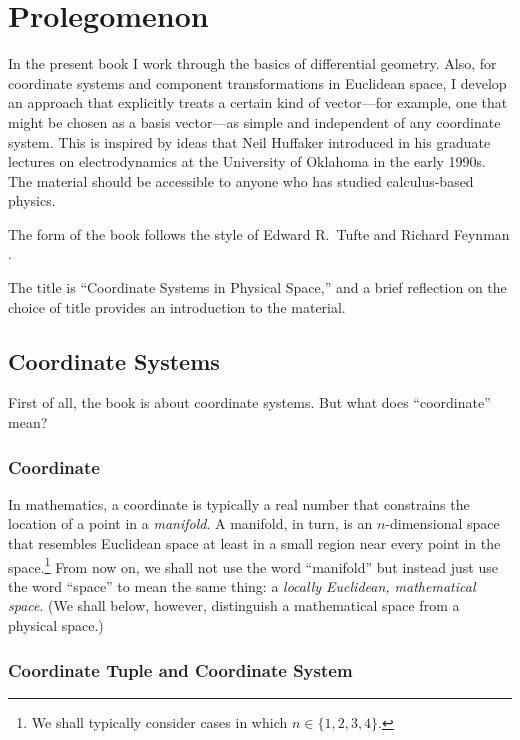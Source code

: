 \cleardoublepage
\chapter*{Prolegomenon}

In the present book I work through the basics of differential geometry.  Also,
for coordinate systems and component transformations in Euclidean space, I
develop an approach that explicitly treats a certain kind of vector---for
example, one that might be chosen as a basis vector---as simple and independent
of any coordinate system.  This is inspired by ideas that Neil Huffaker
introduced in his graduate lectures on electrodynamics at the University of
Oklahoma in the early 1990s.  The material should be accessible to anyone who
has studied calculus-based physics.

The form of the book follows the style of Edward R.~Tufte and Richard Feynman
\citep{pkg-tufte}.

The title is ``Coordinate Systems in Physical Space,'' and a brief reflection
on the choice of title provides an introduction to the material.

\section{Coordinate Systems}

First of all, the book is about coordinate systems.  But what does
``coordinate'' mean?

\subsection{Coordinate}

In mathematics, a coordinate is typically a real number that constrains the
location of a point in a \emph{manifold}.  A manifold, in turn, is an
$n$-dimensional space that resembles Euclidean space at least in a small region
near every point in the space.\footnote{%
   We shall typically consider cases in which $n \in \{1, 2, 3, 4\}$.%
}
From now on, we shall not use the word ``manifold'' but instead just use the
word ``space'' to mean the same thing: a \emph{locally Euclidean, mathematical
space}.  (We shall below, however, distinguish a mathematical space from a
physical space.)

\subsection{Coordinate Tuple and Coordinate System}

